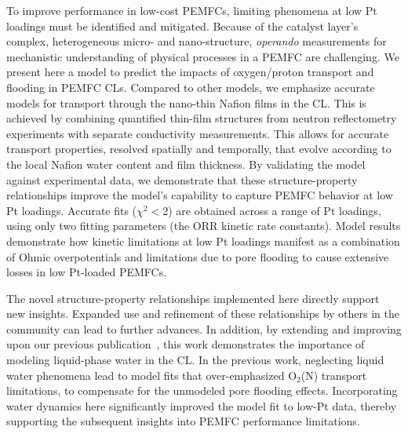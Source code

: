 \documentclass[final,3p,times,twocolumn]{elsarticle}    %
\begin{document}
To improve performance in low-cost PEMFCs, limiting phenomena at low Pt loadings must be identified and mitigated. Because of the catalyst layer's complex, heterogeneous micro- and nano-structure, \emph{operando} measurements for mechanistic understanding of physical processes in a PEMFC are challenging. We present here a model to predict the impacts of oxygen/proton transport and flooding in PEMFC CLs. Compared to other models, we emphasize accurate models for transport through the nano-thin Nafion films in the CL. This is achieved by combining quantified thin-film structures from neutron reflectometry experiments with separate conductivity measurements. This allows for accurate transport properties, resolved spatially and temporally, that evolve according to the local Nafion water content and film thickness. By validating the model against experimental data, we demonstrate that these structure-property relationships improve the model's capability to capture PEMFC behavior at low Pt loadings. Accurate fits ($\chi^2 < 2$) are obtained across a range of Pt loadings, using only two fitting parameters (the ORR kinetic rate constants). Model results demonstrate how kinetic limitations at low Pt loadings manifest as a combination of Ohmic overpotentials and limitations due to pore flooding to cause extensive losses in low Pt-loaded PEMFCs. 

The novel structure-property relationships implemented here directly support new insights. Expanded use and refinement of these relationships by others in the community can lead to further advances. In addition, by extending and improving upon our previous publication~\cite{bib:randall_2020}, this work demonstrates the importance of modeling liquid-phase water in the CL. In the previous work, neglecting liquid water phenomena lead to model fits that over-emphasized O$_{2}$(N) transport limitations, to compensate for the unmodeled pore flooding effects. Incorporating water dynamics here significantly improved the model fit to low-Pt data, thereby supporting the subsequent insights into PEMFC performance limitations.
\end{document}
